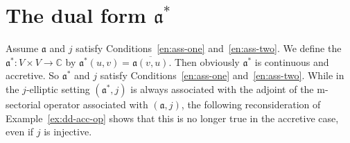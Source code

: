 \documentclass[a4paper,oneside,12pt]{amsart}
\theoremstyle{plain}
\theoremstyle{definition}
\begin{document}
\section{The dual form \texorpdfstring{${{\mathfrak{{a}}}}^*$}{}}\label{sec:dual-form}

Assume ${{\mathfrak{{a}}}}$ and $j$ satisfy Conditions~\ref{en:ass-one} and~\ref{en:ass-two}.
We define the {\textbf{\unboldmath}} ${{\mathfrak{{a}}}}^*\colon V\times V\to{\mathbb{C}}$ by ${{\mathfrak{{a}}}}^*(u,v)={\overline{{{{\mathfrak{{a}}}}(v,u)}}}$. Then obviously
${{\mathfrak{{a}}}}^*$ is continuous and accretive. So ${{\mathfrak{{a}}}}^*$ and $j$ satisfy Conditions~\ref{en:ass-one} and~\ref{en:ass-two}.
While in the $j$-elliptic setting $({{\mathfrak{{a}}}}^*,j)$ is always associated with the adjoint of the {\ensuremath{\text{m}}}-sectorial operator associated with $({{\mathfrak{{a}}}},j)$,
the following reconsideration of Example~\ref{ex:dd-acc-op} shows that this is no longer true in the accretive case, even if $j$ is injective.
\end{document}
